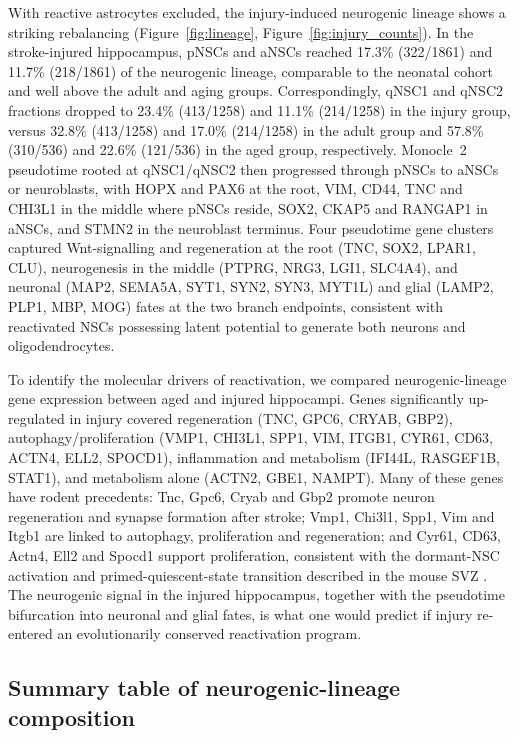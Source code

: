 \documentclass[11pt]{article}
\begin{document}
With reactive astrocytes excluded, the injury-induced neurogenic lineage
shows a striking rebalancing (Figure~\ref{fig:lineage}, Figure~\ref{fig:injury_counts}).
In the stroke-injured hippocampus, pNSCs and aNSCs reached 17.3\%
(322/1861) and 11.7\% (218/1861) of the neurogenic lineage, comparable to
the neonatal cohort and well above the adult and aging groups.
Correspondingly, qNSC1 and qNSC2 fractions dropped to 23.4\% (413/1258)
and 11.1\% (214/1258) in the injury group, versus 32.8\% (413/1258) and
17.0\% (214/1258) in the adult group and 57.8\% (310/536) and 22.6\%
(121/536) in the aged group, respectively. Monocle~2 pseudotime rooted at
qNSC1/qNSC2 then progressed through pNSCs to aNSCs or neuroblasts, with
HOPX and PAX6 at the root, VIM, CD44, TNC and CHI3L1 in the middle where
pNSCs reside, SOX2, CKAP5 and RANGAP1 in aNSCs, and STMN2 in the
neuroblast terminus. Four pseudotime gene clusters captured Wnt-signalling
and regeneration at the root (TNC, SOX2, LPAR1, CLU), neurogenesis in the
middle (PTPRG, NRG3, LGI1, SLC4A4), and neuronal (MAP2, SEMA5A, SYT1,
SYN2, SYN3, MYT1L) and glial (LAMP2, PLP1, MBP, MOG) fates at the two
branch endpoints, consistent with reactivated NSCs possessing latent
potential to generate both neurons and oligodendrocytes.

To identify the molecular drivers of reactivation, we compared
neurogenic-lineage gene expression between aged and injured hippocampi.
Genes significantly up-regulated in injury covered regeneration (TNC,
GPC6, CRYAB, GBP2), autophagy/proliferation (VMP1, CHI3L1, SPP1, VIM,
ITGB1, CYR61, CD63, ACTN4, ELL2, SPOCD1), inflammation and metabolism
(IFI44L, RASGEF1B, STAT1), and metabolism alone (ACTN2, GBE1, NAMPT). Many
of these genes have rodent precedents: Tnc, Gpc6, Cryab and Gbp2 promote
neuron regeneration and synapse formation after stroke; Vmp1, Chi3l1, Spp1,
Vim and Itgb1 are linked to autophagy, proliferation and regeneration; and
Cyr61, CD63, Actn4, Ell2 and Spocd1 support proliferation, consistent with
the dormant-NSC activation and primed-quiescent-state transition described
in the mouse SVZ \cite{llorensbobadilla2015single}. The neurogenic signal
in the injured hippocampus, together with the pseudotime bifurcation into
neuronal and glial fates, is what one would predict if injury re-entered
an evolutionarily conserved reactivation program.

\subsection{Summary table of neurogenic-lineage composition}
\end{document}
